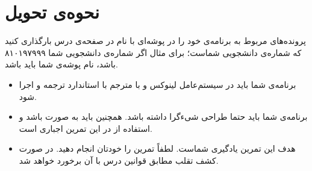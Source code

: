 \documentclass{utap}
\begin{document}
	\section{نحوه‌ی تحویل}
		پرونده‌‌های مربوط به برنامه‌ی خود را در پوشه‌ای با نام  در صفحه‌ی  درس بارگذاری کنید که  شماره‌ی دانشجویی شماست؛ برای مثال اگر شماره‌ی دانشجویی شما ۸۱۰۱۹۷۹۹۹ باشد، نام پوشه‌ی شما باید  باشد.
		\begin{itemize}
			\item
						برنامه‌ی شما باید در سیستم‌عامل لینوکس و با مترجم  با استاندارد  ترجمه و اجرا شود.
					\item
						برنامه‌ی شما باید حتما طراحی شیءگرا داشته باشد. همچنین باید به صورت  باشد و استفاده از  در این تمرین اجباری است.
					\item
						هدف این تمرین یادگیری شماست. لطفاً تمرین را خودتان انجام دهید. در صورت کشف تقلب مطابق قوانین درس با آن برخورد خواهد شد.
		\end{itemize}
\end{document}
